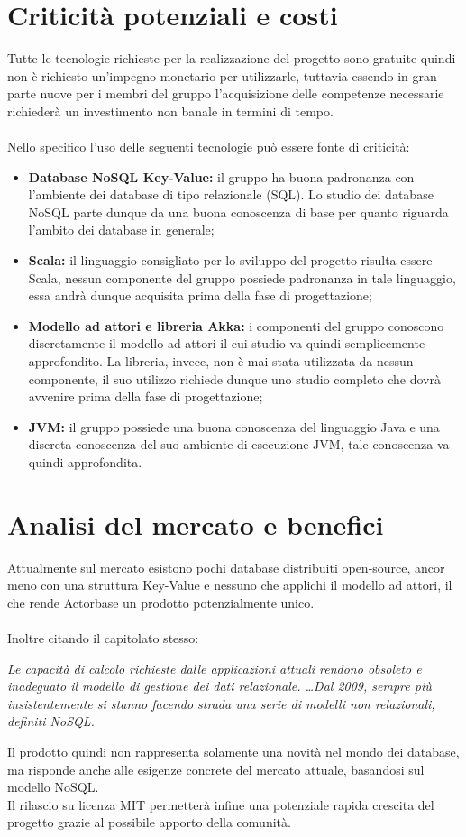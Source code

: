 \documentclass[a4paper]{report}
\begin{document}
		\section{Criticità potenziali e costi}
			Tutte le tecnologie richieste per la realizzazione del progetto sono gratuite quindi non è richiesto
			un'impegno monetario per utilizzarle, tuttavia essendo in gran parte nuove per i membri del gruppo 
			l'acquisizione delle competenze necessarie richiederà un investimento non banale in termini di
			 tempo.
			\\ \\
			Nello specifico l'uso delle seguenti tecnologie può essere fonte di criticità:
			\begin{itemize}
				\item \textbf{Database NoSQL Key-Value:} il gruppo ha buona padronanza con l'ambiente dei 
				database di tipo relazionale (SQL). Lo studio dei database NoSQL parte dunque 
				da una buona conoscenza di base per quanto riguarda l'ambito dei database in generale;
				\item \textbf{Scala:} il linguaggio consigliato per lo sviluppo del progetto risulta essere Scala, 
				nessun componente del gruppo possiede padronanza in tale linguaggio, essa andrà dunque 
				acquisita prima della fase di progettazione;
				\item \textbf{Modello ad attori e libreria Akka:} i componenti del gruppo conoscono
				 discretamente il modello ad attori il cui studio va quindi semplicemente approfondito. La 
				 libreria, invece, non è mai stata utilizzata da nessun componente, il suo utilizzo richiede dunque
				 uno studio completo che dovrà avvenire prima della fase di progettazione;
				 \item \textbf{JVM:} il gruppo possiede una buona conoscenza del linguaggio Java e una 
				 discreta conoscenza del suo ambiente di esecuzione JVM, tale conoscenza va quindi
				  approfondita.
			\end{itemize}
		\section{Analisi del mercato e benefici}
			Attualmente sul mercato esistono pochi database distribuiti open-source, ancor meno con una
			struttura Key-Value e nessuno che applichi il modello ad attori, il che rende Actorbase un prodotto
			potenzialmente unico. 
			\\ \\
			Inoltre citando il capitolato stesso:
			\begin{center}
				\emph{Le capacità di calcolo richieste dalle applicazioni attuali rendono obsoleto e inadeguato
				il modello di gestione dei dati relazionale. \dots \space Dal 2009, sempre più insistentemente si
				stanno facendo strada una serie di modelli non relazionali, definiti NoSQL.}
			\end{center}
			Il prodotto quindi non rappresenta solamente una novità nel mondo dei database, ma risponde 
			anche alle esigenze concrete del mercato attuale, basandosi sul modello NoSQL.\\
			Il rilascio su licenza MIT permetterà infine una potenziale rapida crescita del progetto grazie al
			possibile apporto della comunità.
\end{document}
